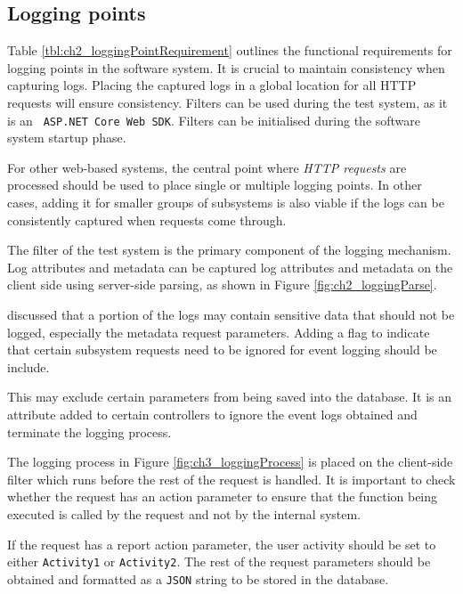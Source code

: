 \clearpage

\subsection{Logging points}
Table \ref{tbl:ch2_loggingPointRequirement} outlines the functional requirements for logging points in the software system. It is crucial to maintain consistency when capturing logs. Placing the captured logs in a global location for all HTTP requests will ensure consistency. Filters can be used during the test system, as it is an \texttt{ ASP.NET Core Web SDK}. Filters can be initialised during the software system startup phase.\par For other web-based systems, the central point where \textit{HTTP requests} are processed should be used to place single or multiple logging points. In other cases, adding it for smaller groups of subsystems is also viable if the logs can be consistently captured when requests come through. \par The filter of the test system is the primary component of the logging mechanism. Log attributes and metadata can be captured log attributes and metadata on the client side using server-side parsing, as shown in Figure \ref{fig:ch2_loggingParse}. \par {} discussed that a portion of the logs may contain sensitive data that should not be logged, especially the metadata request parameters. Adding a flag to indicate that certain subsystem requests need to be ignored for event logging should be include. \par This may exclude certain parameters from being saved into the database. It is an attribute added to certain controllers to ignore the event logs obtained and terminate the logging process. \par The logging process in Figure \ref{fig:ch3_loggingProcess} is placed on the client-side filter which runs before the rest of the request is handled. It is important to check whether the request has an action parameter to ensure that the function being executed is called by the request and not by the internal system. \par If the request has a report action parameter, the user activity should be set to either \texttt{Activity1} or \texttt{Activity2}. The rest of the request parameters should be obtained and formatted as a \texttt{JSON} string to be stored in the database.

\clearpage

